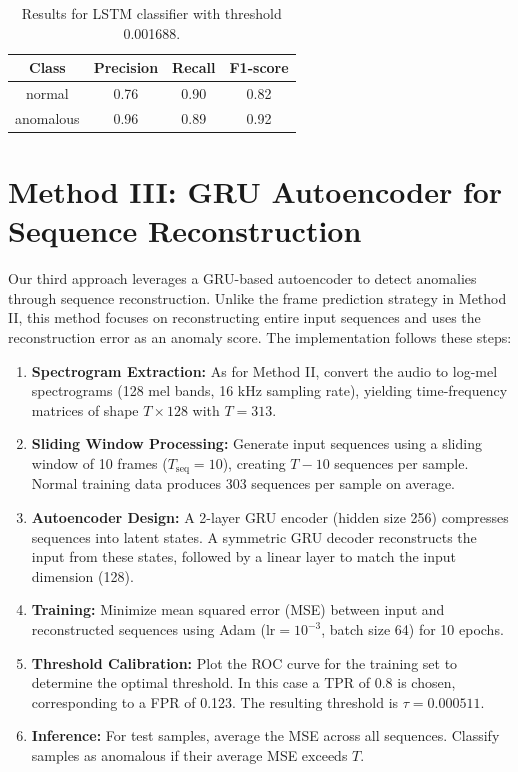 \documentclass[ngerman]{scrartcl}
\begin{document}
\begin{table}[h]
    \centering
    \begin{tabular}{|c|c|c|c|}
        \hline
        Class & Precision & Recall & F1-score \\
        \hline
        normal  & 0.76  & 0.90   & 0.82   \\
        anomalous  & 0.96  & 0.89  & 0.92  \\
        \hline
    \end{tabular}
    \caption{Results for LSTM classifier with threshold 0.001688.}
    \label{tab:results}
\end{table}

\section*{Method III: GRU Autoencoder for Sequence Reconstruction}

Our third approach leverages a GRU-based autoencoder to detect anomalies through sequence reconstruction. Unlike the frame prediction strategy in Method II, this method focuses on reconstructing entire input sequences and uses the reconstruction error as an anomaly score. The implementation follows these steps:

\begin{enumerate}
  \item \textbf{Spectrogram Extraction:} As for Method II, convert the audio to log-mel spectrograms (128 mel bands, 16 kHz sampling rate), yielding time-frequency matrices of shape \(T \times 128\) with \(T=313\).
  \item \textbf{Sliding Window Processing:} Generate input sequences using a sliding window of 10 frames (\(T_{\text{seq}} = 10\)), creating \(T - 10\) sequences per sample. Normal training data produces \(303\) sequences per sample on average.
  \item \textbf{Autoencoder Design:} A 2-layer GRU encoder (hidden size 256) compresses sequences into latent states. A symmetric GRU decoder reconstructs the input from these states, followed by a linear layer to match the input dimension (128).
  \item \textbf{Training:} Minimize mean squared error (MSE) between input and reconstructed sequences using Adam (\(\text{lr} = 10^{-3}\), batch size 64) for 10 epochs.
  \item \textbf{Threshold Calibration:} Plot the ROC curve for the training set to determine the optimal threshold. In this case a TPR of 0.8 is chosen, corresponding to a FPR of 0.123. The resulting threshold is \(\tau = 0.000511\).
  \item \textbf{Inference:} For test samples, average the MSE across all sequences. Classify samples as anomalous if their average MSE exceeds \(T\).
\end{enumerate}
\end{document}
